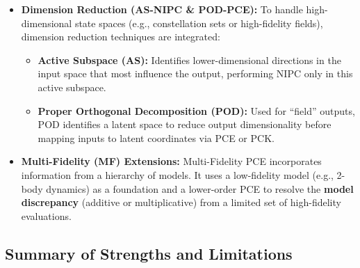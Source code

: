 \documentclass[
  letterpaper,
  DIV=11,
  numbers=noendperiod,
  oneside]{scrartcl}
\providecommand{\tightlist}{%
  \setlength{\itemsep}{0pt}\setlength{\parskip}{0pt}}
\begin{document}
\begin{itemize}
  \begin{itemize}
  \tightlist
  \item
    \textbf{Methodology:} The initial large Gaussian distribution is
    split into \(N\) smaller Gaussian sub-components (h-refinement). A
    lower-order PCE is then applied to each sub-component
    (p-refinement). This ``hp-refinement'' strategy reduces the domain
    of approximation for each element, allowing for rapid convergence
    where global PCE might fail.
  \end{itemize}
\item
  \textbf{Dimension Reduction (AS-NIPC \& POD-PCE):} To handle
  high-dimensional state spaces (e.g., constellation sets or
  high-fidelity fields), dimension reduction techniques are integrated:

  \begin{itemize}
  \item
    \textbf{Active Subspace (AS):} Identifies lower-dimensional
    directions in the input space that most influence the output,
    performing NIPC only in this active subspace.
  \item
    \textbf{Proper Orthogonal Decomposition (POD):} Used for ``field''
    outputs, POD identifies a latent space to reduce output
    dimensionality before mapping inputs to latent coordinates via PCE
    or PCK.
  \end{itemize}
\item
  \textbf{Multi-Fidelity (MF) Extensions:} Multi-Fidelity PCE
  incorporates information from a hierarchy of models. It uses a
  low-fidelity model (e.g., 2-body dynamics) as a foundation and a
  lower-order PCE to resolve the \textbf{model discrepancy} (additive or
  multiplicative) from a limited set of high-fidelity evaluations.
\end{itemize}

\subsection{Summary of Strengths and
Limitations}\label{summary-of-strengths-and-limitations}
\end{document}
